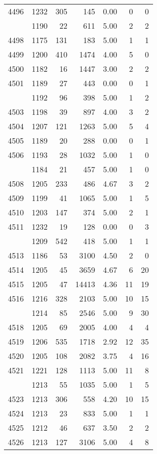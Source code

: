 \documentclass[
]{article}
\begin{document}
\begin{table}
\begin{tabular}[t]{lrrrrrr}
4496 & 1232 & 305 & 145 & 0.00 & 0 & 0\\
\addlinespace
4497 & 1190 & 22 & 611 & 5.00 & 2 & 2\\
4498 & 1175 & 131 & 183 & 5.00 & 1 & 1\\
4499 & 1200 & 410 & 1474 & 4.00 & 5 & 0\\
4500 & 1182 & 16 & 1447 & 3.00 & 2 & 2\\
4501 & 1189 & 27 & 443 & 0.00 & 0 & 1\\
\addlinespace
4502 & 1192 & 96 & 398 & 5.00 & 1 & 2\\
4503 & 1198 & 39 & 897 & 4.00 & 3 & 2\\
4504 & 1207 & 121 & 1263 & 5.00 & 5 & 4\\
4505 & 1189 & 20 & 288 & 0.00 & 0 & 1\\
4506 & 1193 & 28 & 1032 & 5.00 & 1 & 0\\
\addlinespace
4507 & 1184 & 21 & 457 & 5.00 & 1 & 0\\
4508 & 1205 & 233 & 486 & 4.67 & 3 & 2\\
4509 & 1199 & 41 & 1065 & 5.00 & 1 & 5\\
4510 & 1203 & 147 & 374 & 5.00 & 2 & 1\\
4511 & 1232 & 19 & 128 & 0.00 & 0 & 3\\
\addlinespace
4512 & 1209 & 542 & 418 & 5.00 & 1 & 1\\
4513 & 1186 & 53 & 3100 & 4.50 & 2 & 0\\
4514 & 1205 & 45 & 3659 & 4.67 & 6 & 20\\
4515 & 1205 & 47 & 14413 & 4.36 & 11 & 19\\
4516 & 1216 & 328 & 2103 & 5.00 & 10 & 15\\
\addlinespace
4517 & 1214 & 85 & 2546 & 5.00 & 9 & 30\\
4518 & 1205 & 69 & 2005 & 4.00 & 4 & 4\\
4519 & 1206 & 535 & 1718 & 2.92 & 12 & 35\\
4520 & 1205 & 108 & 2082 & 3.75 & 4 & 16\\
4521 & 1221 & 128 & 1113 & 5.00 & 11 & 8\\
\addlinespace
4522 & 1213 & 55 & 1035 & 5.00 & 1 & 5\\
4523 & 1213 & 306 & 558 & 4.20 & 10 & 15\\
4524 & 1213 & 23 & 833 & 5.00 & 1 & 1\\
4525 & 1212 & 46 & 637 & 3.50 & 2 & 2\\
4526 & 1213 & 127 & 3106 & 5.00 & 4 & 8\\

\end{tabular}
\end{table}
\end{document}
